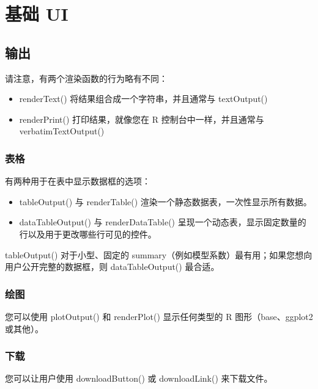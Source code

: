 \chapter{基础 UI\label{ch02}}
\section{输出}
请注意，有两个渲染函数的行为略有不同：
\begin{itemize}
    \item renderText() 将结果组合成一个字符串，并且通常与 textOutput()
    \item renderPrint() 打印结果，就像您在 R 控制台中一样，并且通常与 verbatimTextOutput()
\end{itemize}
\subsection{表格}
有两种用于在表中显示数据框的选项：

\begin{itemize}
    \item tableOutput() 与 renderTable() 渲染一个静态数据表，一次性显示所有数据。

    \item dataTableOutput() 与 renderDataTable() 呈现一个动态表，显示固定数量的行以及用于更改哪些行可见的控件。
\end{itemize}

tableOutput() 对于小型、固定的 summary（例如模型系数）最有用；如果您想向用户公开完整的数据框，则 dataTableOutput() 最合适。
\subsection{绘图}
您可以使用 plotOutput() 和 renderPlot() 显示任何类型的 R 图形（base、ggplot2 或其他）。
\subsection{下载}
您可以让用户使用 downloadButton() 或 downloadLink() 来下载文件。